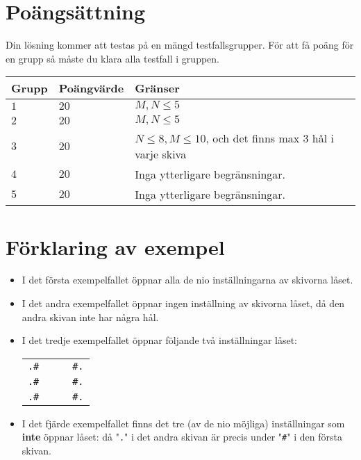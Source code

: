 \section*{Poängsättning}
Din lösning kommer att testas på en mängd testfallsgrupper.
För att få poäng för en grupp så måste du klara alla testfall i gruppen.

\noindent
\begin{tabular}{| l | l | l |}
  \hline
  Grupp & Poängvärde & Gränser \\ \hline
  $1$    & $20$        &  $M, N \le 5$ \\ \hline 
  $2$    & $20$        &  $M, N \le 5$ \\ \hline 
  $3$    & $20$        &  $N \le 8, M \le 10$, och det finns max 3 hål i varje skiva \\ \hline 
  $4$    & $20$        &  Inga ytterligare begränsningar. \\ \hline
  $5$    & $20$        &  Inga ytterligare begränsningar. \\ \hline
\end{tabular}

\section*{Förklaring av exempel}

\begin{itemize}
  \item
I det första exempelfallet öppnar alla de nio inställningarna av skivorna låset.

  \item
I det andra exempelfallet öppnar ingen inställning av skivorna låset, då den andra skivan inte har några hål.

  \item
I det tredje exempelfallet öppnar följande två inställningar låset:
\begin{center}
  \begin{tabular}{ll|ll}
    \texttt{.\#}&&& \texttt{\#.}\\
    \texttt{.\#}&&& \texttt{\#.}\\
    \texttt{.\#}&&& \texttt{\#.}
  \end{tabular}
\end{center}

  \item
    I det fjärde exempelfallet finns det tre (av de nio möjliga) inställningar som \textbf{inte} öppnar låset: då "\texttt{.}" i det andra skivan är precis under
    "\texttt{\#}" i den första skivan.

\end{itemize}
